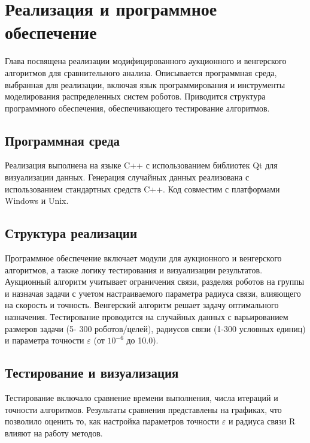 \chapter{Реализация и программное обеспечение} \label{ch3}

Глава посвящена реализации модифицированного аукционного и венгерского алгоритмов для сравнительного анализа. Описывается программная среда, выбранная для реализации, включая язык программирования и инструменты моделирования распределенных систем роботов. Приводится структура программного обеспечения, обеспечивающего тестирование алгоритмов.

\section{Программная среда}

Реализация выполнена на языке C++ с использованием библиотек Qt для визуализации данных. Генерация случайных данных реализована с использованием стандартных средств C++. Код совместим с платформами Windows и Unix.

\section{Структура реализации}

Программное обеспечение включает модули для аукционного и венгерского алгоритмов, а также логику тестирования и визуализации результатов. Аукционный алгоритм учитывает ограничения связи, разделяя роботов на группы и назначая задачи с учетом настраиваемого параметра радиуса связи, влияющего на скорость и точность. Венгерский алгоритм решает задачу оптимального назначения. Тестирование проводится на случайных данных с варьированием размеров задачи (5- 300 роботов/целей), радиусов связи (1-300 условных единиц) и параметра точности $\varepsilon$ (от $10^{-6}$ до 10.0).

\section{Тестирование и визуализация}

Тестирование включало сравнение времени выполнения, числа итераций и точности алгоритмов. Результаты сравнения представлены на графиках, что позволило оценить то, как настройка параметров точности $\varepsilon$ и радиуса связи R влияют на работу методов.